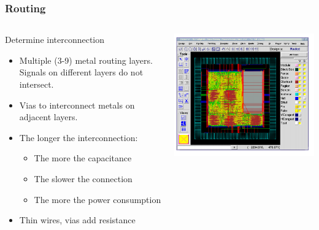 \documentclass[compress]{beamer}
\begin{document}
\begin{frame}
	\frametitle{Routing}
	\begin{columns}	
		\begin{block}{Determine interconnection}
			\begin{itemize}
				\item Multiple (3-9) metal routing layers. Signals on different layers do not intersect.
				\item Vias to interconnect metals on adjacent layers.
				\item The longer the interconnection: 
				\begin{itemize}
					\item The more the capacitance
					\item The slower the connection
					\item The more the power consumption
				\end{itemize}
				\item Thin wires, vias add resistance
			\end{itemize}
		\end{block}
		\begin{center}
			\includegraphics[width=\textwidth]{route2}
		\end{center}
	\end{columns}
\end{frame}
\end{document}
